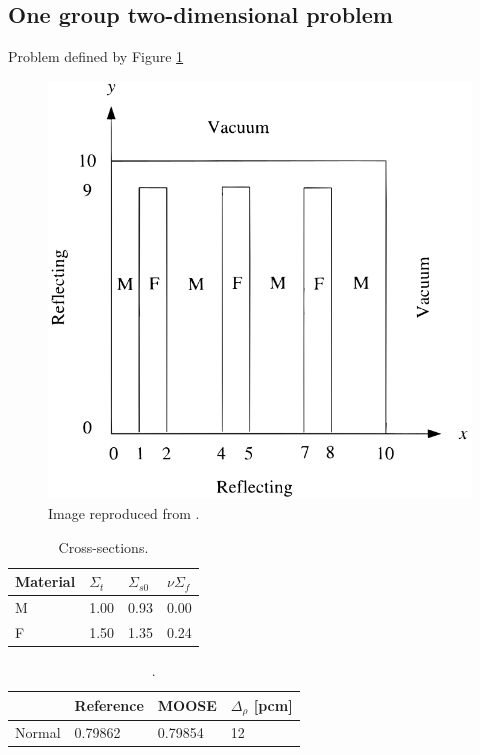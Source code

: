 \documentclass{anstrans}
\begin{document}
\subsection{One group two-dimensional problem}

Problem defined by \cite{brantley_simplifiedP3_2000}
Figure \ref{fig:2D}

\begin{figure}[htbp!] %
    \centering
    \includegraphics[width=0.95\linewidth]{figures/brantley-larsen.png}
    \hfill
    \caption{Image reproduced from \cite{brantley_simplifiedP3_2000}.}
    \label{fig:2D}
\end{figure}

\begin{table}[htbp!]
	\centering
	\caption{Cross-sections.}
	\label{tab:cross-sections}
	\begin{tabular}{l l l l}
	\toprule
	Material	& $\Sigma_t$ & $\Sigma_{s0}$ & $\nu\Sigma_f$ \\
	\midrule
	M 			& 1.00		& 0.93			& 0.00			\\
	F 			& 1.50		& 1.35			& 0.24			\\
	\bottomrule
	\end{tabular}
\end{table}

\begin{table}[htbp!]
	\centering
	\caption{.}
	\label{tab:keff}
	\begin{tabular}{llll}
	\toprule
							& Reference & MOOSE 	& $\Delta_{\rho}$ [pcm]	\\
	\midrule
	Normal 					& 0.79862	& 0.79854	& 12					\\
	\bottomrule
	\end{tabular}
\end{table}
\end{document}
